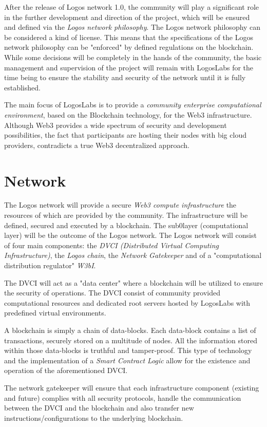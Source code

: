 \documentclass[]{article}
\begin{document}
After the release of Logos network 1.0, the community will play a significant role in the further development and direction of the project, which will be ensured and defined via the \textit{Logos network philosophy}.
The Logos network philosophy can be considered a kind of license.
This means that the specifications of the Logos network philosophy can be "enforced" by defined regulations on the blockchain.
While some decisions will be completely in the hands of the community, the basic management and supervision of the project will remain with LogosLabs for the time being to ensure the stability and security of the network until it is fully established.

The main focus of LogosLabs is to provide a \textit{community enterprise computational environment}, based on the Blockchain technology, for the Web3 infrastructure.
Although Web3 provides a wide spectrum of security and development possibilities, the fact that participants are hosting their nodes with big cloud providers, contradicts a true Web3 decentralized approach.

\section{Network}
The Logos network will provide a secure \textit{Web3 compute infrastructure} the resources of which are provided by the community.
The infrastructure will be defined, secured and executed by a blockchain.
The sub0layer (computational layer) will be the outcome of the Logos network.
The Logos network will consist of four main components: the \textit{DVCI (Distributed Virtual Computing Infrastructure)}, the \textit{Logos chain}, the \textit{Network Gatekeeper} and of a "computational distribution regulator" \textit{W3bI}. 

The DVCI will act as a "data center" where a blockchain will be utilized to ensure the security of operations.
The DVCI consist of community provided computational resources and dedicated root servers hosted by LogosLabs with predefined virtual environments.

A blockchain is simply a chain of data-blocks.
Each data-block contains a list of transactions, securely stored on a multitude of nodes. 
All the information stored within those data-blocks is truthful and tamper-proof.
This type of technology and the implementation of a \textit{Smart Contract Logic} allow for the existence and operation of the aforementioned DVCI.

The network gatekeeper will ensure that each infrastructure component (existing and future) complies with all security protocols, handle the communication between the DVCI and the blockchain and also transfer new instructions/configurations to the underlying blockchain.
\end{document}
